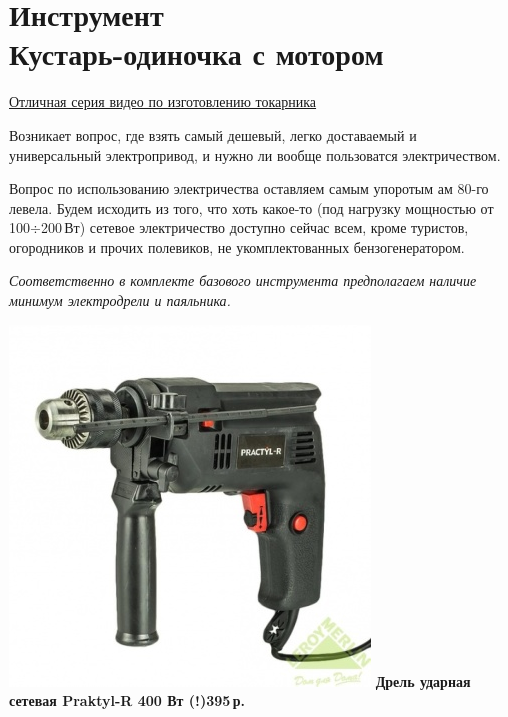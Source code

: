 \documentclass{magazine}
\begin{document}
\section{Инструмент\\Кустарь-одиночка с мотором}
\begin{multicols}{2}

\href{https://www.youtube.com/playlist?list=PL6mXlWgvuzAu4jMVzOOKXXDVF3r1yAaz4}{Отличная
серия видео по изготовлению токарника}

Возникает вопрос, где взять самый дешевый, легко доставаемый и универсальный
электропривод, и нужно ли вообще пользоватся электричеством.

Вопрос по использованию электричества оставляем самым упоротым \scr ам 80-го
левела. Будем исходить из того, что хоть какое-то (под нагрузку мощностью от
100$\div$200\,Вт) сетевое электричество доступно сейчас всем, кроме туристов,
огородников и прочих полевиков, не укомплектованных бензогенератором.

\emph{Соответственно в комплекте базового инструмента предполагаем наличие
минимум электродрели и паяльника.}

\noindent\href{http://leroymerlin.ru/catalogue/instrumenty/elektroinstrument/dreli\_udarnye/13805983/}{
\includegraphics[width=\columnwidth]{fig/00/PraktylR.jpg}}
\textbf{Дрель ударная сетевая Praktyl-R 400 Вт (!)395\,р.}


\end{multicols}
\end{document}
